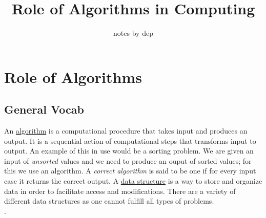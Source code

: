 \documentclass{tufte-book}
\title{Role of Algorithms in Computing}
\author[Role of Algorithms]{notes by dep}
\begin{document}








\section{Role of Algorithms}
\subsection{General Vocab}
\quad An \underline{algorithm} is a computational procedure that takes input and produces an output. It is a sequential action of computational steps that transforms input to output. An example of this in use would be a sorting problem. We are given an input of \textit{unsorted} values and we need to produce an ouput of sorted values; for this we use an algorithm. A \textit{correct algorithm} is said to be one if for every input case it returns the correct output. A \underline{data structure} is a way to store and organize data in order to facilitate access and modifications. There are a variety of different data structures as one cannot fulfill all types of problems. 
\\
.  
\end{document}
